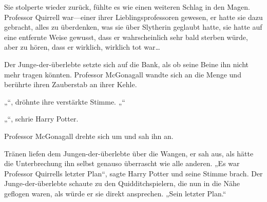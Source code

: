 Sie stolperte wieder zurück, fühlte es wie einen weiteren Schlag in den Magen.
Professor Quirrell war—einer ihrer Lieblingsprofessoren gewesen, er hatte sie dazu gebracht, alles zu überdenken, was sie über Slytherin geglaubt hatte, sie hatte auf eine entfernte Weise gewusst, dass er wahrscheinlich sehr bald sterben würde, aber zu hören, dass er wirklich, wirklich tot war…

Der Junge-der-überlebte setzte sich auf die Bank, als ob seine Beine ihn nicht mehr tragen könnten. Professor McGonagall wandte sich an die Menge und berührte ihren Zauberstab an ihrer Kehle.

„“, dröhnte ihre verstärkte Stimme. „“

„“, schrie Harry Potter.

Professor McGonagall drehte sich um und sah ihn an.

Tränen liefen dem Jungen-der-überlebte über die Wangen, er sah aus, als hätte die Unterbrechung ihn selbst genauso überrascht wie alle anderen.
„Es war Professor Quirrells letzter Plan“, sagte Harry Potter und seine Stimme brach. Der Junge-der-überlebte schaute zu den Quidditchspielern, die nun in die Nähe geflogen waren, als würde er sie direkt ansprechen.
„Sein letzter Plan.“

